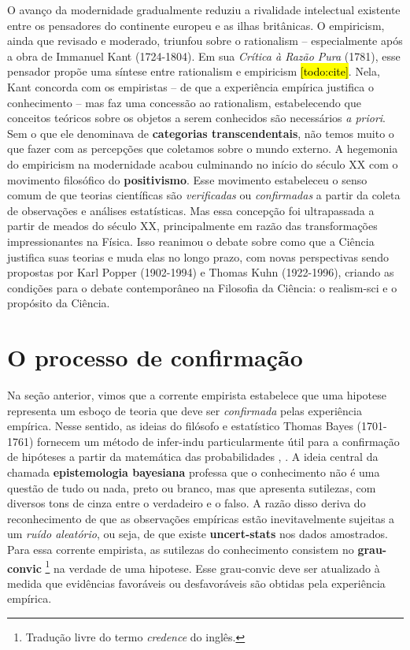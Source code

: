 \documentclass[./main.tex]{subfiles}
\begin{document}
\par O avanço da modernidade gradualmente reduziu a rivalidade intelectual existente entre os pensadores do continente europeu e as ilhas britânicas. O \gls{empiricism}, ainda que revisado e moderado, triunfou sobre o \gls{rationalism} -- especialmente após a obra de Immanuel Kant (1724-1804). Em sua \textit{Crítica à Razão Pura} (1781), esse pensador propõe uma síntese entre \gls{rationalism} e \gls{empiricism} \hl{[todo:cite]}. Nela, Kant concorda com os empiristas -- de que a experiência empírica justifica o conhecimento -- mas faz uma concessão ao \gls{rationalism}, estabelecendo que conceitos teóricos sobre os objetos a serem conhecidos são necessários \textit{a priori}. Sem o que ele denominava de \textbf{categorias transcendentais}, não temos muito o que fazer com as percepções que coletamos sobre o mundo externo. A hegemonia do \gls{empiricism} na modernidade  acabou culminando no início do século XX com o movimento filosófico do \textbf{\gls{positivismo}}. Esse movimento estabeleceu o senso comum de que teorias científicas são \textit{verificadas} ou \textit{confirmadas} a partir da coleta de observações e análises estatísticas. Mas essa concepção foi ultrapassada a partir de meados do século XX, principalmente em razão das transformações impressionantes na Física. Isso reanimou o debate sobre como que a Ciência justifica suas teorias e muda elas no longo prazo, com novas perspectivas sendo propostas por Karl Popper (1902-1994) e Thomas Kuhn (1922-1996), criando as condições para o debate contemporâneo na Filosofia da Ciência: o \gls{realism-sci} e o propósito da Ciência.

\section{O processo de confirmação} \label{sec:epis:bayes}

\par Na seção anterior, vimos que a corrente empirista estabelece que uma \gls{hipotese} representa um esboço de \gls{teoria} que deve ser \textit{confirmada} pelas experiência empírica. Nesse sentido, as ideias do filósofo e estatístico Thomas Bayes (1701-1761) fornecem um método de \gls{infer-indu} particularmente útil para a confirmação de hipóteses a partir da matemática das probabilidades \cite{sep-epistemology-bayesian}, \cite{sprenger2019}. A ideia central da chamada \textbf{epistemologia bayesiana} professa que o conhecimento não é uma questão de tudo ou nada, preto ou branco, mas que apresenta sutilezas, com diversos tons de cinza entre o verdadeiro e o falso. A razão disso deriva do reconhecimento de que as observações empíricas estão inevitavelmente sujeitas a um \textit{ruído aleatório}, ou seja, de que existe \textbf{\gls{uncert-stats}} nos dados amostrados. Para essa corrente empirista, as sutilezas do conhecimento consistem no \textbf{\gls{grau-convic}} \footnote{Tradução livre do termo \textit{credence} do inglês.} na verdade de uma \gls{hipotese}. Esse \gls{grau-convic} deve ser atualizado à medida que evidências favoráveis ou desfavoráveis são obtidas pela experiência empírica. 
\end{document}
